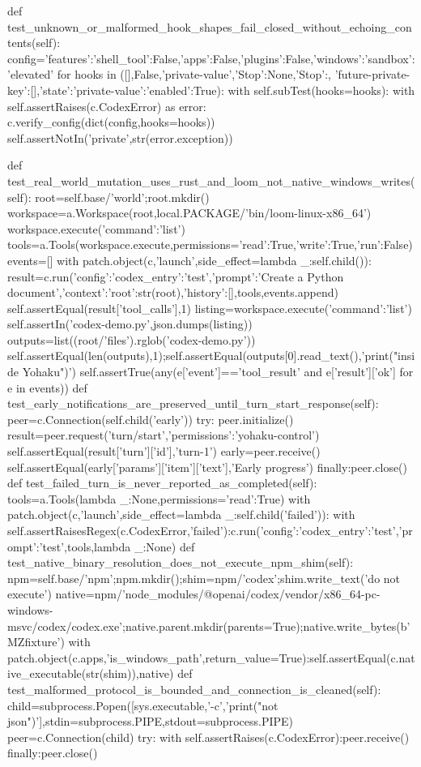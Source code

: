     def test_unknown_or_malformed_hook_shapes_fail_closed_without_echoing_contents(self):
        config={'features':{'shell_tool':False,'apps':False,'plugins':False},'windows':{'sandbox':'elevated'}}
        for hooks in ([],False,'private-value',{'Stop':None},{'Stop':{}},
                      {'future-private-key':[]},{'state':{'private-value':{'enabled':True}}}):
            with self.subTest(hooks=hooks):
                with self.assertRaises(c.CodexError) as error:
                    c.verify_config(dict(config,hooks=hooks))
                self.assertNotIn('private',str(error.exception))

    def test_real_world_mutation_uses_rust_and_loom_not_native_windows_writes(self):
        root=self.base/'world';root.mkdir()
        workspace=a.Workspace(root,local.PACKAGE/'bin/loom-linux-x86_64')
        workspace.execute({'command':'list'})
        tools=a.Tools(workspace.execute,permissions={'read':True,'write':True,'run':False})
        events=[]
        with patch.object(c,'launch',side_effect=lambda _:self.child()):
            result=c.run({'config':{'codex_entry':'test'},'prompt':'Create a Python document','context':{'root':str(root)},'history':[]},tools,events.append)
        self.assertEqual(result['tool_calls'],1)
        listing=workspace.execute({'command':'list'})
        self.assertIn('codex-demo.py',json.dumps(listing))
        outputs=list((root/'files').rglob('codex-demo.py'))
        self.assertEqual(len(outputs),1);self.assertEqual(outputs[0].read_text(),'print("inside Yohaku")\n')
        self.assertTrue(any(e['event']=='tool_result' and e['result']['ok'] for e in events))
    def test_early_notifications_are_preserved_until_turn_start_response(self):
        peer=c.Connection(self.child('early'))
        try:
            peer.initialize()
            result=peer.request('turn/start',{'permissions':'yohaku-control'})
            self.assertEqual(result['turn']['id'],'turn-1')
            early=peer.receive()
            self.assertEqual(early['params']['item']['text'],'Early progress')
        finally:peer.close()
    def test_failed_turn_is_never_reported_as_completed(self):
        tools=a.Tools(lambda _:None,permissions={'read':True})
        with patch.object(c,'launch',side_effect=lambda _:self.child('failed')):
            with self.assertRaisesRegex(c.CodexError,'failed'):c.run({'config':{'codex_entry':'test'},'prompt':'test'},tools,lambda _:None)
    def test_native_binary_resolution_does_not_execute_npm_shim(self):
        npm=self.base/'npm';npm.mkdir();shim=npm/'codex';shim.write_text('do not execute')
        native=npm/'node_modules/@openai/codex/vendor/x86_64-pc-windows-msvc/codex/codex.exe';native.parent.mkdir(parents=True);native.write_bytes(b'MZfixture')
        with patch.object(c.apps,'is_windows_path',return_value=True):self.assertEqual(c.native_executable(str(shim)),native)
    def test_malformed_protocol_is_bounded_and_connection_is_cleaned(self):
        child=subprocess.Popen([sys.executable,'-c','print("not json")'],stdin=subprocess.PIPE,stdout=subprocess.PIPE)
        peer=c.Connection(child)
        try:
            with self.assertRaises(c.CodexError):peer.receive()
        finally:peer.close()

